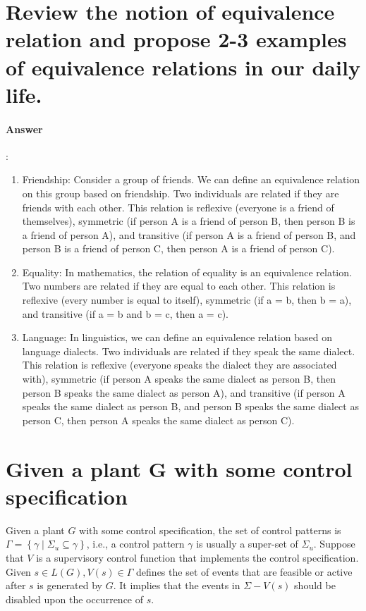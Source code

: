 \documentclass{article}
\begin{document}
\section{Review the notion of equivalence relation and propose 2-3 examples of equivalence relations in our daily life.}

\paragraph{Answer}:
\begin{enumerate}
  \item Friendship: Consider a group of friends. We can define an equivalence relation on this group based on friendship. Two individuals are related if they are friends with each other. This relation is reflexive (everyone is a friend of themselves), symmetric (if person A is a friend of person B, then person B is a friend of person A), and transitive (if person A is a friend of person B, and person B is a friend of person C, then person A is a friend of person C).
  \item Equality: In mathematics, the relation of equality is an equivalence relation. Two numbers are related if they are equal to each other. This relation is reflexive (every number is equal to itself), symmetric (if a = b, then b = a), and transitive (if a = b and b = c, then a = c).
  \item Language: In linguistics, we can define an equivalence relation based on language dialects. Two individuals are related if they speak the same dialect. This relation is reflexive (everyone speaks the dialect they are associated with), symmetric (if person A speaks the same dialect as person B, then person B speaks the same dialect as person A), and transitive (if person A speaks the same dialect as person B, and person B speaks the same dialect as person C, then person A speaks the same dialect as person C).
\end{enumerate}


\section{Given a plant G with some control specification}
Given a plant $G$ with some control specification, the set of control patterns is $\Gamma=\left\{\gamma \mid \Sigma_u \subseteq \gamma\right\}$, i.e., a control pattern $\gamma$ is usually a super-set of $\Sigma_u$. Suppose that $V$ is a supervisory control function that implements the control specification. Given $s \in L(G), V(s) \in \Gamma$ defines the set of events that are feasible or active after $s$ is generated by $G$. It implies that the events in $\Sigma-V(s)$ should be disabled upon the occurrence of $s$.
\end{document}
